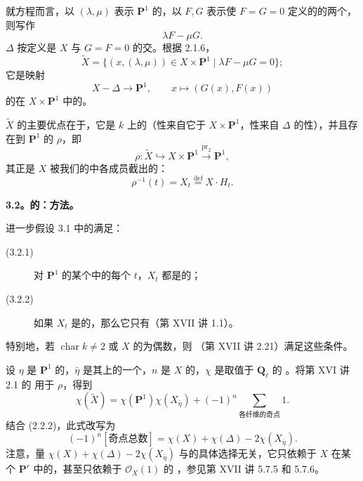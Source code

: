 就方程而言，以 $(\lambda,\mu)$ 表示 $\mathbf P^1$ 的，以 $F,G$ 表示使 $F=G=0$ 定义的的两个，则写作
\[
 \lambda F-\mu G.\tag{3.1.1}
\]
 $\Delta$ 按定义是 $X$ 与 $G=F=0$ 的交。根据 2.1.6，
\[
 \widetilde X=\{(x,(\lambda,\mu))\in X\times\mathbf P^1\mid\lambda F-\mu G=0\};\tag{3.1.2}
\]
它是映射
\[
 X-\Delta\longrightarrow\mathbf P^1,\qquad x\longmapsto(G(x),F(x))\tag{3.1.3}
\]
的在 $X\times\mathbf P^1$ 中的。

$\widetilde X$ 的主要优点在于，它是 $k$ 上的（性来自它于 $X\times\mathbf P^1$，性来自 $\Delta$ 的性），并且存在到 $\mathbf P^1$ 的 $\rho$，即
\[
 \rho:\widetilde X\hookrightarrow X\times\mathbf P^1\xrightarrow{\operatorname{pr}_2}\mathbf P^1,\tag{3.1.4}
\]
其正是 $X$ 被我们的中各成员截出的：
\[
 \rho^{-1}(t)=X_t\overset{\mathrm{def}}=X\cdot H_t.
\]

\textbf{3.2。的：方法。}

进一步假设 3.1 中的满足：
\begin{description}
\item[(3.2.1)] 对 $\mathbf P^1$ 的某个中的每个 $t$，$X_t$ 都是的；
\item[(3.2.2)] 如果 $X_t$ 是的，那么它只有（第 XVII 讲 1.1）。
\end{description}
特别地，若 $\operatorname{char}k\ne2$ 或 $X$ 的为偶数，则 （第 XVII 讲 2.21）满足这些条件。

设 $\eta$ 是 $\mathbf P^1$ 的，$\bar\eta$ 是其上的一个，$n$ 是 $X$ 的，$\chi$ 是取值于 $\mathbf Q_\ell$ 的 。将第 XVI 讲 2.1 的 用于 $\rho$，得到
\[
 \chi(\widetilde X)=\chi(\mathbf P^1)\chi(X_{\bar\eta})+(-1)^n\sum_{\text{各纤维的奇点}}1.\tag{3.2.3}
\]
结合 (2.2.2)，此式改写为
\[
 (-1)^n[\text{奇点总数}]=\chi(X)+\chi(\Delta)-2\chi(X_{\bar\eta}).\tag{3.2.4}
\]
注意，量 $\chi(X)+\chi(\Delta)-2\chi(X_{\bar\eta})$ 与的具体选择无关，它只依赖于 $X$ 在某个 $\mathbf P^r$ 中的，甚至只依赖于 $\mathscr O_X(1)$ 的 ，参见第 XVII 讲 5.7.5 和 5.7.6。

